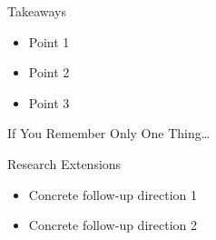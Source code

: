 \documentclass[aspectratio=169]{beamer}
\begin{document}
\begin{frame}{Takeaways}
  \begin{itemize}
    \item Point 1
    \item Point 2
    \item Point 3
  \end{itemize}
\end{frame}

\begin{frame}{If You Remember Only One Thing\dots}
  \begin{center}
  \end{center}
\end{frame}

\begin{frame}{Research Extensions}
  \begin{itemize}
    \item Concrete follow-up direction 1
    \item Concrete follow-up direction 2
  \end{itemize}
\end{frame}
\end{document}
